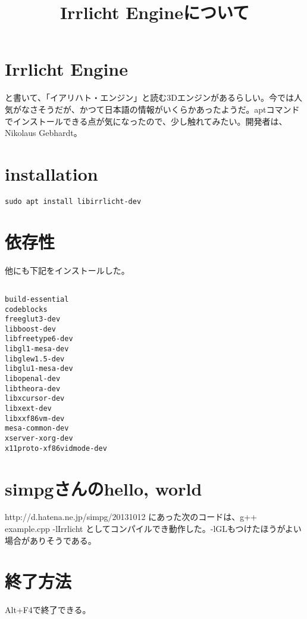 \documentclass[uplatex,dvipdfmx]{jsarticle} \usepackage{amsmath,amssymb,bm}
\title{Irrlicht Engineについて} \author{} \date{}
\begin{document}
\maketitle



\section*{Irrlicht Engine}
と書いて、「イアリハト・エンジン」と読む3Dエンジンがあるらしい。今では人気がなさそうだが、かつて日本語の情報がいくらかあったようだ。aptコマンドでインストールできる点が気になったので、少し触れてみたい。開発者は、Nikolaus Gebhardt。


\section*{installation}
\begin{verbatim}
sudo apt install libirrlicht-dev
\end{verbatim}

\section*{依存性}
他にも下記をインストールした。

\begin{verbatim}

build-essential
codeblocks
freeglut3-dev
libboost-dev
libfreetype6-dev
libgl1-mesa-dev
libglew1.5-dev
libglu1-mesa-dev
libopenal-dev
libtheora-dev
libxcursor-dev
libxext-dev
libxxf86vm-dev
mesa-common-dev
xserver-xorg-dev
x11proto-xf86vidmode-dev
\end{verbatim}


\section*{simpgさんのhello, world}
http://d.hatena.ne.jp/simpg/20131012 にあった次のコードは、g++ example.cpp -lIrrlicht としてコンパイルでき動作した。-lGLもつけたほうがよい場合がありそうである。



\section*{終了方法}

Alt+F4で終了できる。


\vspace{\baselineskip}
\begin{paracol}{2}
\switchcolumn
\end{paracol}
\end{document}
